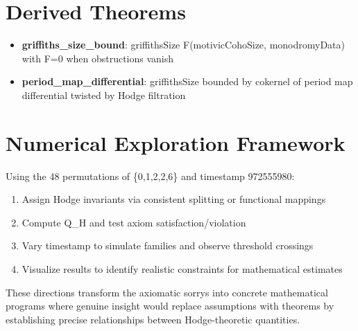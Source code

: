 \documentclass[11pt]{article}
\begin{document}
\section{Derived Theorems}
\begin{itemize}
\item \textbf{griffiths\_size\_bound}: griffithsSize \leq F(motivicCohoSize, monodromyData) with F=0 when obstructions vanish
\item \textbf{period\_map\_differential}: griffithsSize bounded by cokernel of period map differential twisted by Hodge filtration
\end{itemize}

\section{Numerical Exploration Framework}
Using the 48 permutations of \{0,1,2,2,6\} and timestamp 972555980:
\begin{enumerate}
\item Assign Hodge invariants via consistent splitting or functional mappings
\item Compute Q\_H and test axiom satisfaction/violation
\item Vary timestamp to simulate families and observe threshold crossings
\item Visualize results to identify realistic constraints for mathematical estimates
\end{enumerate}

These directions transform the axiomatic sorrys into concrete mathematical programs where genuine insight would replace assumptions with theorems by establishing precise relationships between Hodge-theoretic quantities.
\end{document}
